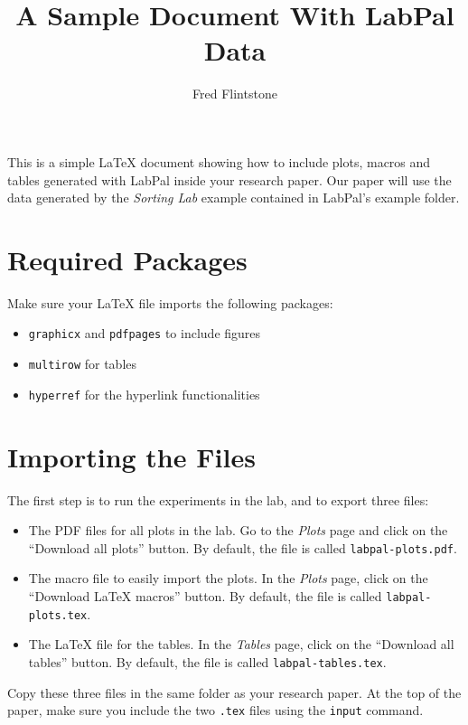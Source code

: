 \documentclass[utf8,twocolumn]{article}
\begin{document}
\title{A Sample Document With LabPal Data}
\author{Fred Flintstone}
\maketitle




This is a simple \LaTeX{} document showing how to include plots, macros and
tables generated with LabPal inside your research paper. Our paper will use the
data generated by the \emph{Sorting Lab} example contained in LabPal's example
folder.

\section*{Required Packages}

Make sure your \LaTeX{} file imports the following packages:

\begin{itemize}
\item \texttt{graphicx} and \texttt{pdfpages} to include figures
\item \texttt{multirow} for tables
\item \texttt{hyperref} for the hyperlink functionalities
\end{itemize}

\section*{Importing the Files}

The first step is to run the experiments in the lab, and to export three files:

\begin{itemize}
\item The PDF files for all plots in the lab. Go to the \textsl{Plots} page and
click on the ``Download all plots'' button. By default, the file is called
\verb+labpal-plots.pdf+.
\item The macro file to easily import the plots. In the \textsl{Plots} page,
click on the ``Download \LaTeX{} macros'' button. By default, the file is called
\verb+labpal-plots.tex+.
\item The \LaTeX{} file for the tables. In the \textsl{Tables} page, click on
the ``Download all tables'' button. By default, the file is called
\verb+labpal-tables.tex+.
\end{itemize}

Copy these three files in the same folder as your research paper. At the top
of the paper, make sure you include the two \texttt{.tex} files using the \texttt{input}
command.
\end{document}
